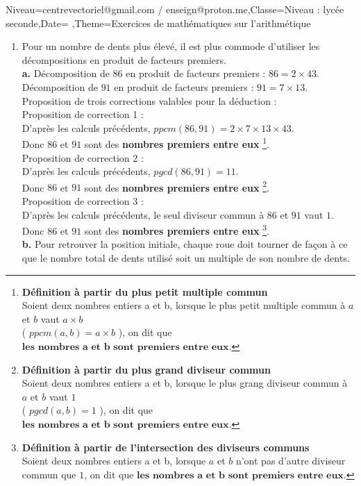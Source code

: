 \documentclass[a4paper,11pt,fleqn]{article}
\begin{document}
\begin{Maquette}[Fiche]{Niveau=centrevectoriel@gmail.com / enseign@proton.me,Classe=Niveau :  lycée seconde,Date=   ,Theme=Exercices de mathématiques  sur l'arithmétique }
\begin{Solution}
\begin{enumerate}[itemsep=1em]
	\item Pour un nombre de dents plus élevé, il est plus commode d'utiliser les décompositions en produit de facteurs premiers.\\\textbf {a.}  Décomposition de $86$ en produit de facteurs premiers :  $86 = 2\times43$.\\ Décomposition de $91$ en produit de facteurs premiers :  $91 = 7\times13$.\\Proposition de trois corrections valables pour la déduction : \\Proposition de correction 1 : \\D'après les calculs précédents, $ppcm(86,91)= 2\times7\times13\times43$.\\Donc $86$ et $91$ sont des \textbf{nombres premiers entre eux} \footnote{\textbf{Définition à partir du plus petit multiple commun} \\ Soient deux nombres entiers a et b, lorsque le plus petit multiple commun à $a$ et $b$ vaut $a \times b$ \\( $ppcm(a,b)=a\times b$ ), on dit que $\textbf{les nombres a et b sont premiers entre eux}$.}.\\Proposition de correction 2 : \\D'après les calculs précédents, $pgcd(86,91)= 1 1$.\\Donc $86$ et $91$ sont des \textbf{nombres premiers entre eux} \footnote{\textbf{Définition à partir du plus grand diviseur commun} \\ Soient deux nombres entiers a et b, lorsque le plus grang diviseur commun à $a$ et $b$ vaut $1$ \\ ( $pgcd(a,b)=1$ ), on dit que $\textbf{les nombres a et b sont premiers entre eux}$.}.\\Proposition de correction 3 : \\D'après les calculs précédents, le seul diviseur commun à $86$ et $91$ vaut $1$.\\ Donc $86$ et $91$ sont des \textbf{nombres premiers entre eux} \footnote{\textbf{Définition à partir de l'intersection des diviseurs communs} \\ Soient deux nombres entiers a et b, lorsque $a$ et $b$ n'ont pas d'autre diviseur commun que $1$, on dit que $\textbf{les nombres a et b sont premiers entre eux}$.}.\\\textbf {b.}  Pour retrouver la position initiale,
          chaque roue doit tourner de façon à ce que le nombre total de dents utilisé soit un multiple de son nombre
          de dents.\\

\end{enumerate}
\end{Solution}
\end{Maquette}
\end{document}
